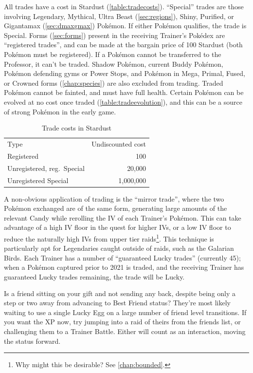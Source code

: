 All trades have a cost in Stardust (\autoref{table:tradecosts}).
``Special'' trades are those involving Legendary, Mythical, Ultra Beast (\autoref{sec:regions}),
  Shiny, Purified, or Gigantamax (\autoref{sec:dmaxgmax}) Pokémon.
If either Pokémon qualifies, the trade is Special.
Forms (\autoref{sec:forms}) present in the receiving Trainer's Pokédex are
  ``registered trades'', and can be made at the bargain price of 100 Stardust
  (both Pokémon must be registered).
If a Pokémon cannot be transferred to the Professor, it can't be traded.
Shadow Pokémon, current Buddy Pokémon, Pokémon defending gyms or Power Stops, and Pokémon
 in Mega, Primal, Fused, or Crowned forms (\autoref{chap:species}) are also excluded from trading.
Traded Pokémon cannot be fainted, and must have full health.
Certain Pokémon can be evolved at no cost once traded (\autoref{table:tradeevolution}),
 and this can be a source of strong Pokémon in the early game.
\begin{table}
\centering
\begin{tabular}{lr}
Type & Undiscounted cost \\
\Midrule
Registered & 100 \\
Unregistered, reg.\ Special & 20,000 \\
Unregistered Special & 1,000,000 \\
\end{tabular}
\caption{Trade costs in Stardust\label{table:tradecosts}}
\end{table}

A non-obvious application of trading is the ``mirror trade'', where the
 two Pokémon exchanged are of the same form, generating large amounts
 of the relevant Candy while rerolling the IV of each Trainer's Pokémon.
This can take advantage of a high IV floor in the quest for higher IVs, or
 a low IV floor to reduce the naturally high IVs from upper tier raids\footnote{Why might this be desirable? See \autoref{chap:bounded}.}.
This technique is particularly apt for Legendaries caught outside of raids,
 such as the Galarian Birds.
Each Trainer has a number of ``guaranteed Lucky trades'' (currently 45); when a Pokémon
 captured prior to 2021 is traded, and the receiving Trainer has guaranteed Lucky trades
 remaining, the trade will be Lucky.

\begin{tipbox}[title=Forcing a friendship forward]
Is a friend sitting on your gift and not sending any back, despite being only a step
 or two away from advancing to Best Friend status?
They're most likely waiting to use a single Lucky Egg on a large number of
 friend level transitions.
If you want the XP now, try jumping into a raid of theirs from the friends list, or challenging them to a Trainer Battle.
Either will count as an interaction, moving the status forward.
\end{tipbox}

